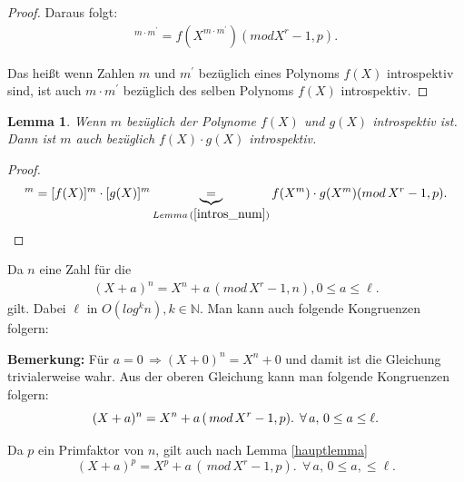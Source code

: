 \documentclass[12pt,oneside]{article}
\newtheorem{lemma}[theorem]{Lemma}
\theoremstyle{remark}
\theoremstyle{definition}
\begin{document}
\begin{flushleft}
\begin{proof}
Daraus folgt:
\begin{align*}
    [f(X)]^{m \cdot m^{'}} = f(X^{m \cdot m^{'}}) ( mod X^r - 1, p).
\end{align*}

Das heißt wenn Zahlen $m$ und $m^{'}$ bezüglich eines Polynoms $f(X)$ introspektiv sind, ist auch $m \cdot m^{'}$ bezüglich des selben Polynoms $f(X)$ introspektiv. 
\end{proof}

\smallskip

\begin{lemma}\label{intros_pol}
Wenn $m$ bezüglich der Polynome $f(X)$ und $g(X)$ introspektiv ist. Dann ist $m$ auch bezüglich $f(X) \cdot g(X)$ introspektiv.  
\end{lemma}
\begin{proof}
\begin{align*}
    [f(X) \cdot g(X)]^{m} = [f(X)]^m \cdot [g(X)]^m \underbrace{=}_{Lemma \, (\ref{intros_num})} f(X^m) \cdot g(X^m)(mod \, X^r - 1, p).
\end{align*}

\end{proof}

Da $n$ eine Zahl für die 
\begin{align*}
    (X + a)^n = X^n + a \, (mod  \, X^r - 1, n), 0 \leq a \leq \ell. 
\end{align*}
gilt. Dabei $\ell$ in $O(log^k n ), k \in \mathbb{N}$. Man kann auch folgende Kongruenzen folgern:\newline\newline

\textbf{Bemerkung:} Für $a = 0 \,  \Rightarrow (X + 0)^n = X^n + 0$ und damit ist die Gleichung trivialerweise wahr.\newline\newline 
Aus der oberen Gleichung kann man folgende Kongruenzen folgern:
\begin{equation}\label{fintro}
(X + a)^n = X^n + a \, (\, mod \, X^r - 1, p).
\; \, \forall\,a, \, 0 \leq a \leq \ell.\newline\newline
\end{equation}

Da $p$ ein Primfaktor von $n$, gilt auch nach Lemma \ref{hauptlemma} \newline
\begin{equation}\label{sintro}
    (X + a)^p = X^p + a \, (\, mod \, X^r - 1, p). \; \, \forall\,a, \, 0 \leq a, \leq \ell.
\end{equation}


\end{flushleft}
\end{document}
